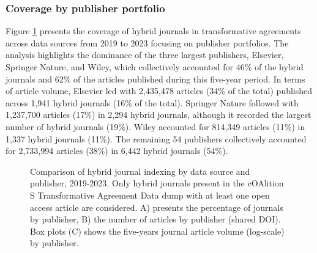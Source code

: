 \documentclass[a4paper,man,floatsintext,longtable,noextraspace,10pt]{apa6}
\begin{document}
\subsubsection{Coverage by publisher
portfolio}\label{coverage-by-publisher-portfolio}

Figure \ref{fig-upset_coverage_results_publisher} presents the coverage
of hybrid journals in transformative agreements across data sources from
2019 to 2023 focusing on publisher portfolios. The analysis highlights
the dominance of the three largest publishers, Elsevier, Springer
Nature, and Wiley, which collectively accounted for 46\% of the hybrid
journals and 62\% of the articles published during this five-year
period. In terms of article volume, Elsevier led with 2,435,478 articles
(34\% of the total) published across 1,941 hybrid journals (16\% of the
total). Springer Nature followed with 1,237,700 articles (17\%) in 2,294
hybrid journals, although it recorded the largest number of hybrid
journals (19\%). Wiley accounted for 814,349 articles (11\%) in 1,337
hybrid journals (11\%). The remaining 54 publishers collectively
accounted for 2,733,994 articles (38\%) in 6,442 hybrid journals (54\%).

\begin{figure}[ht!]


\caption{\label{fig-upset_coverage_results_publisher}Comparison of
hybrid journal indexing by data source and publisher, 2019-2023. Only
hybrid journals present in the cOAlition S Transformative Agreement Data
dump with at least one open access article are considered. A) presents
the percentage of journals by publisher, B) the number of articles by
publisher (shared DOI). Box plots (C) shows the five-years journal
article volume (log-scale) by publisher.}

\end{figure}%
\end{document}
